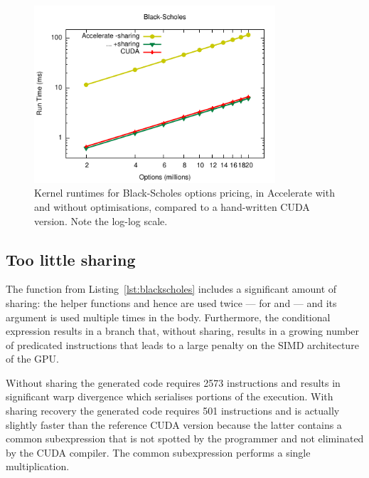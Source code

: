 \begin{figure}
    \begin{center}
        \includegraphics[width=0.8\textwidth]{images/sec-6/black-scholes/black-scholes}
    \end{center}
    \caption[Black-Scholes kernel benchmarks]{Kernel runtimes for Black-Scholes
        options pricing, in Accelerate with and without optimisations, compared
        to a hand-written CUDA version. Note the log-log scale.}
    \label{fig:blackscholes}
\end{figure}

\subsection{Too little sharing}

The function  from Listing~\ref{lst:blackscholes} includes a
significant amount of sharing: the helper functions  and hence
 are used twice --- for  and  --- and its
argument  is used multiple times in the body. Furthermore, the
conditional expression  results in a branch that,
without sharing, results in a growing number of predicated instructions that
leads to a large penalty on the SIMD architecture of the GPU.

Without sharing the generated code requires 2573 instructions and results in
significant warp divergence which serialises portions of the execution. With
sharing recovery the generated code requires 501 instructions and is actually
slightly faster than the reference CUDA version because the latter contains a
common subexpression that is not spotted by the programmer and not eliminated by
the CUDA compiler. The common subexpression performs a single multiplication.


